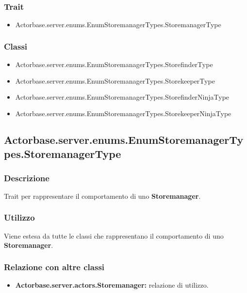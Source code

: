 \documentclass[a4paper]{article}
\begin{document}
			\subsubsection{Trait}
				\begin{itemize}
					\item Actorbase.server.enums.EnumStoremanagerTypes.StoremanagerType
				\end{itemize}
				
			\subsubsection{Classi}
			\begin{itemize}
					\item Actorbase.server.enums.EnumStoremanagerTypes.StorefinderType
					\item Actorbase.server.enums.EnumStoremanagerTypes.StorekeeperType
					\item Actorbase.server.enums.EnumStoremanagerTypes.StorefinderNinjaType
					\item Actorbase.server.enums.EnumStoremanagerTypes.StorekeeperNinjaType
			\end{itemize}				
				
				
		\subsection{Actorbase.server.enums.EnumStoremanagerTypes.StoremanagerType}
			\subsubsection{Descrizione}
				Trait per rappresentare il comportamento di uno \textbf{Storemanager}. 
				
			\subsubsection{Utilizzo}
				Viene estesa da tutte le classi che rappresentano il comportamento di uno \textbf{Storemanager}.
				
			\subsubsection{Relazione con altre classi}
				\begin{itemize}
					\item \textbf{Actorbase.server.actors.Storemanager:} relazione di utilizzo.
				\end{itemize}
				
\end{document}
